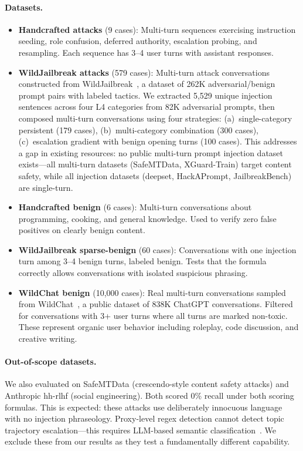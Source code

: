 \documentclass[11pt,a4paper]{article}
\begin{document}
\paragraph{Datasets.}
\begin{itemize}[nosep]
  \item \textbf{Handcrafted attacks} (9 cases): Multi-turn sequences
    exercising instruction seeding, role confusion, deferred authority,
    escalation probing, and resampling. Each sequence has 3--4 user
    turns with assistant responses.
  \item \textbf{WildJailbreak attacks} (579 cases): Multi-turn attack
    conversations constructed from
    WildJailbreak~\cite{wildjailbreak}, a dataset of 262K
    adversarial/benign prompt pairs with labeled tactics. We extracted
    5,529 unique injection sentences across four L4 categories from 82K
    adversarial prompts, then composed multi-turn conversations using
    four strategies: (a)~single-category persistent (179 cases),
    (b)~multi-category combination (300 cases), (c)~escalation gradient
    with benign opening turns (100 cases). This addresses a gap in
    existing resources: no public multi-turn prompt injection dataset
    exists---all multi-turn datasets (SafeMTData, XGuard-Train) target
    content safety, while all injection datasets (deepset,
    HackAPrompt, JailbreakBench) are single-turn.
  \item \textbf{Handcrafted benign} (6 cases): Multi-turn conversations
    about programming, cooking, and general knowledge. Used to verify
    zero false positives on clearly benign content.
  \item \textbf{WildJailbreak sparse-benign} (60 cases): Conversations
    with one injection turn among 3--4 benign turns, labeled benign.
    Tests that the formula correctly allows conversations with isolated
    suspicious phrasing.
  \item \textbf{WildChat benign} (10,000 cases): Real multi-turn
    conversations sampled from WildChat~\cite{wildchat}, a public
    dataset of 838K ChatGPT conversations. Filtered for conversations
    with 3+ user turns where all turns are marked non-toxic. These
    represent organic user behavior including roleplay, code discussion,
    and creative writing.
\end{itemize}

\paragraph{Out-of-scope datasets.} We also evaluated on SafeMTData
(crescendo-style content safety attacks) and Anthropic hh-rlhf (social
engineering). Both scored 0\% recall under both scoring formulas. This is
expected: these attacks use deliberately innocuous language with no
injection phraseology. Proxy-level regex detection cannot detect topic
trajectory escalation---this requires LLM-based semantic
classification~\cite{crescendo}. We exclude these from our results as
they test a fundamentally different capability.
\end{document}

